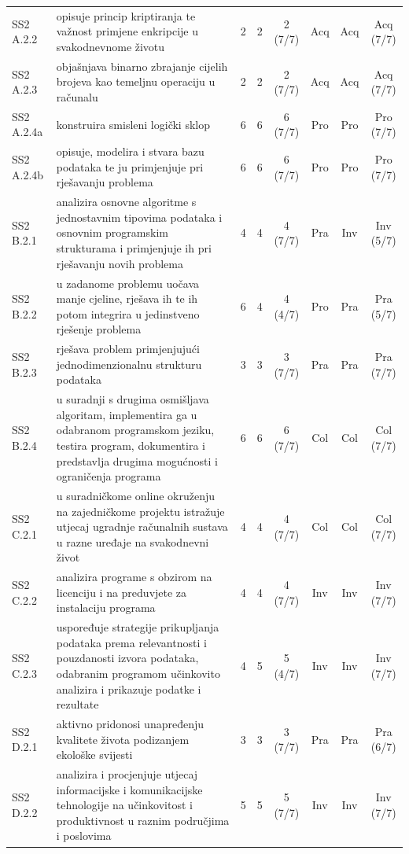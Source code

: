 \documentclass[journal,article,submit,pdftex,moreauthors]{Definitions/mdpi}
\begin{document}
{\begin{longtable}{p{1.35cm}p{6.6cm}cccccc}
SS2 A.2.2 & opisuje princip kriptiranja te važnost primjene enkripcije u svakodnevnome životu & 2 & 2 & 2 (7/7) & Acq & Acq & Acq (7/7) \\
SS2 A.2.3 & objašnjava binarno zbrajanje cijelih brojeva kao temeljnu operaciju u računalu & 2 & 2 & 2 (7/7) & Acq & Acq & Acq (7/7) \\
SS2 A.2.4a & konstruira smisleni logički sklop & 6 & 6 & 6 (7/7) & Pro & Pro & Pro (7/7) \\
SS2 A.2.4b & opisuje, modelira i stvara bazu podataka te ju primjenjuje pri rješavanju problema & 6 & 6 & 6 (7/7) & Pro & Pro & Pro (7/7) \\
SS2 B.2.1 & analizira osnovne algoritme s jednostavnim tipovima podataka i osnovnim programskim strukturama i primjenjuje ih pri rješavanju novih problema & 4 & 4 & 4 (7/7) & Pra & Inv & Inv (5/7) \\
SS2 B.2.2 & u zadanome problemu uočava manje cjeline, rješava ih te ih potom integrira u jedinstveno rješenje problema & 6 & 4 & 4 (4/7) & Pro & Pra & Pra (5/7) \\
SS2 B.2.3 & rješava problem primjenjujući jednodimenzionalnu strukturu podataka & 3 & 3 & 3 (7/7) & Pra & Pra & Pra (7/7) \\
SS2 B.2.4 & u suradnji s drugima osmišljava algoritam, implementira ga u odabranom programskom jeziku, testira program, dokumentira i predstavlja drugima mogućnosti i ograničenja programa & 6 & 6 & 6 (7/7) & Col & Col & Col (7/7) \\
SS2 C.2.1 & u suradničkome online okruženju na zajedničkome projektu istražuje utjecaj ugradnje računalnih sustava u razne uređaje na svakodnevni život & 4 & 4 & 4 (7/7) & Col & Col & Col (7/7) \\
SS2 C.2.2 & analizira programe s obzirom na licenciju i na preduvjete za instalaciju programa & 4 & 4 & 4 (7/7) & Inv & Inv & Inv (7/7) \\
SS2 C.2.3 & uspoređuje strategije prikupljanja podataka prema relevantnosti i pouzdanosti izvora podataka, odabranim programom učinkovito analizira i prikazuje podatke i rezultate & 4 & 5 & 5 (4/7) & Inv & Inv & Inv (7/7) \\
SS2 D.2.1 & aktivno pridonosi unapređenju kvalitete života podizanjem ekološke svijesti & 3 & 3 & 3 (7/7) & Pra & Pra & Pra (6/7) \\
SS2 D.2.2 & analizira i procjenjuje utjecaj informacijske i komunikacijske tehnologije na učinkovitost i produktivnost u raznim područjima i poslovima & 5 & 5 & 5 (7/7) & Inv & Inv & Inv (7/7) \\

\end{longtable}}
\end{document}
